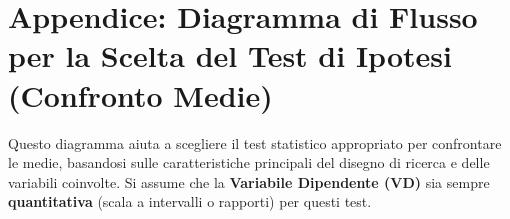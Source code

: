 \documentclass[12pt, a4paper]{article}
\begin{document}
\newpage %
\appendix
\section*{Appendice: Diagramma di Flusso per la Scelta del Test di Ipotesi (Confronto Medie)}
\label{sec:appendice_flowchart}

Questo diagramma aiuta a scegliere il test statistico appropriato per confrontare le medie, basandosi sulle caratteristiche principali del disegno di ricerca e delle variabili coinvolte. Si assume che la \textbf{Variabile Dipendente (VD)} sia sempre \textbf{quantitativa} (scala a intervalli o rapporti) per questi test.
\end{document}
